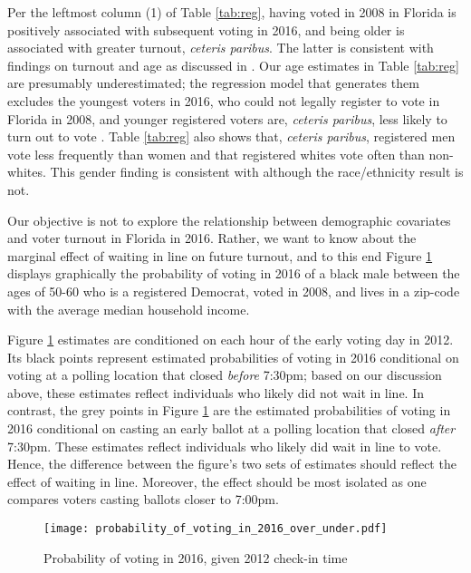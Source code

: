 \documentclass[12pt,titlepage]{article}
\begin{document}
Per the leftmost column (1) of Table \ref{tab:reg}, having voted in
2008 in Florida is positively associated with subsequent voting in
2016, and being older is associated with greater turnout,
\emph{ceteris paribus}.  The latter is consistent with findings on
turnout and age as discussed in \citet{costaetal:walkingthewalk}.  Our
age estimates in Table \ref{tab:reg} are presumably underestimated;
the regression model that generates them excludes the youngest voters
in 2016, who could not legally register to vote in Florida in 2008,
and younger registered voters are, \emph{ceteris paribus}, less likely
to turn out to vote \citep{shinosmith:registrationtiming}.  Table
\ref{tab:reg} also shows that, \emph{ceteris paribus}, registered men
vote less frequently than women and that registered whites vote often
than non-whites.  This gender finding is consistent with
\citet{leighleynagler:whovotesnow} although the race/ethnicity result
is not.

Our objective is not to explore the relationship between demographic
covariates and voter turnout in Florida in 2016.  Rather, we want to
know about the marginal effect of waiting in line on future turnout,
and to this end Figure \ref{fig:prvoting2016} displays graphically the
probability of voting in 2016 of a black male between the ages of
50-60 who is a registered Democrat, voted in 2008, and lives in a
zip-code with the average median household income. 

Figure \ref{fig:prvoting2016} estimates are conditioned on each hour
of the early voting day in 2012. Its black points represent estimated
probabilities of voting in 2016 conditional on voting at a polling
location that closed \emph{before} 7:30pm; based on our discussion
above, these estimates reflect individuals who likely did not wait in
line.  In contrast, the grey points in Figure \ref{fig:prvoting2016}
are the estimated probabilities of voting in 2016 conditional on
casting an early ballot at a polling location that closed \emph{after}
7:30pm.  These estimates reflect individuals who likely did wait in
line to vote.  Hence, the difference between the figure's two sets of
estimates should reflect the effect of waiting in line.  Moreover, the
effect should be most isolated as one compares voters casting ballots
closer to 7:00pm.

\begin{figure}[!ht]
\caption{Probability of voting in 2016, given 2012 check-in time}
  \label{fig:prvoting2016}
  \centering
    \centering\texttt{[image: probability\_of\_voting\_in\_2016\_over\_under.pdf]}
\end{figure}
\end{document}
